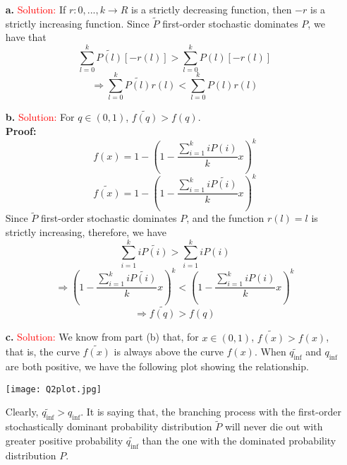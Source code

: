 \documentclass[11pt]{article} %
\begin{document}
\begin{itemize}
        \item[\textbf{a.}] 
\textcolor{red}{Solution:}
If $r: {0,...,k} \to R$ is a strictly decreasing function, then $-r$ is a strictly increasing function. Since $\widetilde{P}$ first-order stochastic dominates $P$, we have that 
$$ \sum_{l=0}^{k} \widetilde{P(l)}[-r(l)]> \sum_{l=0}^{k} P(l) [-r(l)]$$
$$ \Rightarrow \sum_{l=0}^{k} \widetilde{P(l)}r(l) < \sum_{l=0}^{k} P(l) r(l)$$

        \item[\textbf{b.}]
\textcolor{red}{Solution:}
For $q \in (0,1)$, $\widetilde{f(q)} > f(q)$. \\

\textbf{Proof:}
$$ f(x)=1-(1-\frac{\sum_{i=1}^{k} i P(i)}{k} x)^k $$
$$ \widetilde{f(x)}=1-(1-\frac{\sum_{i=1}^{k} i \widetilde{P(i)}}{k} x)^k $$
Since $\widetilde{P}$ first-order stochastic dominates $P$, and the function $r(l)=l$ is strictly increasing, therefore, we have
$$ \sum_{i=1}^{k} i \widetilde{P(i)}>\sum_{i=1}^{k} i P(i) $$
$$ \Rightarrow  (1-\frac{\sum_{i=1}^{k} i \widetilde{P(i)}}{k} x)^k < (1-\frac{\sum_{i=1}^{k} i P(i)}{k} x)^k $$
$$ \Rightarrow \widetilde{f(q)} > f(q) $$


        \item[\textbf{c.}] 
\textcolor{red}{Solution:}
We know from part (b) that, for $x \in (0,1)$, $\widetilde{f(x)} > f(x)$, that is, the curve $\widetilde{f(x)}$ is always above the curve $f(x)$. When $\widetilde{q_{\inf}}$ and $q_{\inf}$ are both positive, we have the following plot showing the relationship.

\begin{center}
\texttt{[image: Q2plot.jpg]}
\end{center}

Clearly, $\widetilde{q_{\inf}} > q_{\inf}$. It is saying that, the branching process with the first-order stochastically dominant probability distribution $\widetilde{P}$ will never die out with greater positive probability $\widetilde{q_{\inf}}$ than the one with the dominated probability distribution $P$.

\end{itemize}
\end{document}
